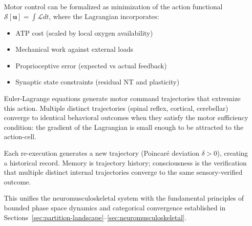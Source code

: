 \begin{principle}
Motor control can be formalized as minimization of the action functional $\mathcal{S}[\mathbf{u}] = \int \mathcal{L} dt$, where the Lagrangian incorporates:
\begin{itemize}[noitemsep]
\item ATP cost (scaled by local oxygen availability)
\item Mechanical work against external loads
\item Proprioceptive error (expected vs actual feedback)
\item Synaptic state constraints (residual NT and plasticity)
\end{itemize}

Euler-Lagrange equations generate motor command trajectories that extremize this action. Multiple distinct trajectories (spinal reflex, cortical, cerebellar) converge to identical behavioral outcomes when they satisfy the motor sufficiency condition: the gradient of the Lagrangian is small enough to be attracted to the action-cell.

Each re-execution generates a new trajectory (Poincaré deviation $\delta > 0$), creating a historical record. Memory is trajectory history; consciousness is the verification that multiple distinct internal trajectories converge to the same sensory-verified outcome.

This unifies the neuromusculoskeletal system with the fundamental principles of bounded phase space dynamics and categorical convergence established in Sections~\ref{sec:partition-landscape}--\ref{sec:neuromusculoskeletal}.
\end{principle}

